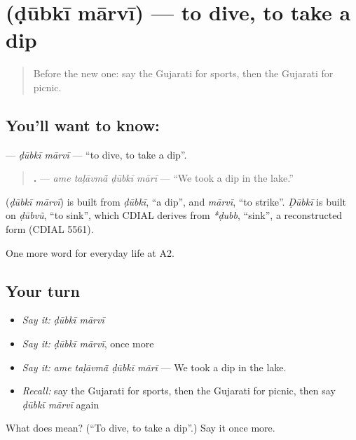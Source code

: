 \section[\texorpdfstring{\gu{ડૂબકી} \gu{મારવી} (ḍūbkī mārvī)}{ડૂબકી મારવી (ḍūbkī mārvī)}]{  (ḍūbkī mārvī) — to dive, to take a dip}

\label{lesson:GU-C262-dubki-marvi}



\begin{quote}
Before the new one: say the Gujarati for sports, then the Gujarati for picnic.
\end{quote}

\subsection*{You'll want to know:  }
\textbf{ } — \emph{ḍūbkī mārvī} — \textquotedblleft{}to dive, to take a dip\textquotedblright{}.

\begin{quote}
\textbf{   .} — \emph{ame taḷāvmā̃ ḍūbkī mārī} — \textquotedblleft{}We took a dip in the lake.\textquotedblright{}
\end{quote}

\begin{cousinweb}
\textbf{ } (\emph{ḍūbkī mārvī}) is built from \emph{ḍūbkī}, \textquotedblleft{}a dip\textquotedblright{}, and \emph{mārvī}, \textquotedblleft{}to strike\textquotedblright{}. \emph{Ḍūbkī} is built on \emph{ḍūbvũ}, \textquotedblleft{}to sink\textquotedblright{}, which CDIAL derives from \emph{*ḍubb}, \textquotedblleft{}sink\textquotedblright{}, a reconstructed form (CDIAL 5561).
\end{cousinweb}

\begin{grammarlens}[title={What you've built}]
One more word for everyday life at A2.
\end{grammarlens}

\subsection*{Your turn}
\begin{itemize}
\raggedright
  \item \emph{Say it:} \emph{ḍūbkī mārvī}
  \item \emph{Say it:} \emph{ḍūbkī mārvī}, once more
  \item \emph{Say it:} \emph{ame taḷāvmā̃ ḍūbkī mārī} — We took a dip in the lake.
  \item \emph{Recall:} say the Gujarati for sports, then the Gujarati for picnic, then say \emph{ḍūbkī mārvī} again
\end{itemize}

\begin{tcolorbox}[breakable,colback=teal!4,colframe=teal!35!black,title={Before you move on}]
What does   mean? (\textquotedblleft{}To dive, to take a dip\textquotedblright{}.) Say it once more.
\end{tcolorbox}
